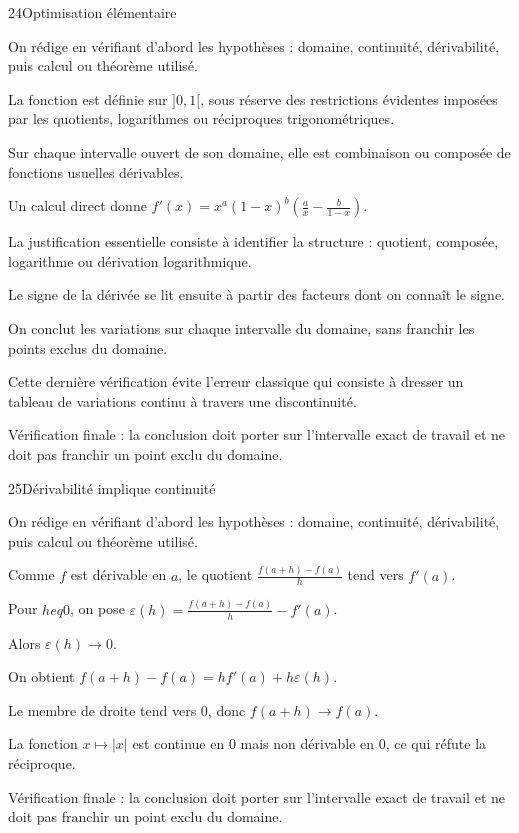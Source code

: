 \documentclass[11pt,a4paper]{article}
\begin{document}
\begin{corrbox}{24}{Optimisation élémentaire}

\begin{methodebox}
On rédige en vérifiant d'abord les hypothèses : domaine, continuité, dérivabilité, puis calcul ou théorème utilisé.
\end{methodebox}

La fonction est définie sur $]0,1[$, sous réserve des restrictions évidentes imposées par les quotients, logarithmes ou réciproques trigonométriques.


Sur chaque intervalle ouvert de son domaine, elle est combinaison ou composée de fonctions usuelles dérivables.


Un calcul direct donne $f'(x)=x^a(1-x)^b\left(\frac{a}{x}-\frac{b}{1-x}\right)$.


La justification essentielle consiste à identifier la structure : quotient, composée, logarithme ou dérivation logarithmique.


Le signe de la dérivée se lit ensuite à partir des facteurs dont on connaît le signe.


On conclut les variations sur chaque intervalle du domaine, sans franchir les points exclus du domaine.


Cette dernière vérification évite l'erreur classique qui consiste à dresser un tableau de variations continu à travers une discontinuité.


\begin{attentionbox}
Vérification finale : la conclusion doit porter sur l'intervalle exact de travail et ne doit pas franchir un point exclu du domaine.
\end{attentionbox}

\end{corrbox}


\begin{corrbox}{25}{Dérivabilité implique continuité}

\begin{methodebox}
On rédige en vérifiant d'abord les hypothèses : domaine, continuité, dérivabilité, puis calcul ou théorème utilisé.
\end{methodebox}

Comme $f$ est dérivable en $a$, le quotient $\frac{f(a+h)-f(a)}h$ tend vers $f'(a)$.


Pour $h
eq0$, on pose $\varepsilon(h)=\frac{f(a+h)-f(a)}h-f'(a)$.


Alors $\varepsilon(h)\to0$.


On obtient $f(a+h)-f(a)=h f'(a)+h\varepsilon(h)$.


Le membre de droite tend vers $0$, donc $f(a+h)\to f(a)$.


La fonction $x\mapsto |x|$ est continue en $0$ mais non dérivable en $0$, ce qui réfute la réciproque.


\begin{attentionbox}
Vérification finale : la conclusion doit porter sur l'intervalle exact de travail et ne doit pas franchir un point exclu du domaine.
\end{attentionbox}

\end{corrbox}
\end{document}
